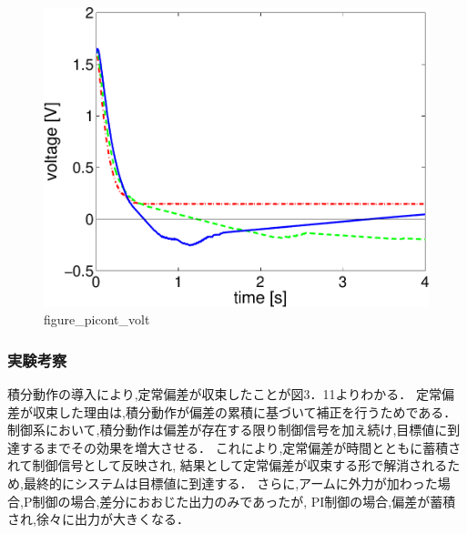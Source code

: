 \begin{figure}[h]
  \centering
  \includegraphics[scale=0.5]{sozai/figure_picont_volt-crop.pdf}
  \caption{figure\_picont\_volt}
\end{figure}

\newpage

\subsubsection{実験考察}
積分動作の導入により,定常偏差が収束したことが図3．11よりわかる．
定常偏差が収束した理由は,積分動作が偏差の累積に基づいて補正を行うためである．
制御系において,積分動作は偏差が存在する限り制御信号を加え続け,目標値に到達するまでその効果を増大させる．
これにより,定常偏差が時間とともに蓄積されて制御信号として反映され,
結果として定常偏差が収束する形で解消されるため,最終的にシステムは目標値に到達する．
さらに,アームに外力が加わった場合,P制御の場合,差分におおじた出力のみであったが,
PI制御の場合,偏差が蓄積され,徐々に出力が大きくなる．


